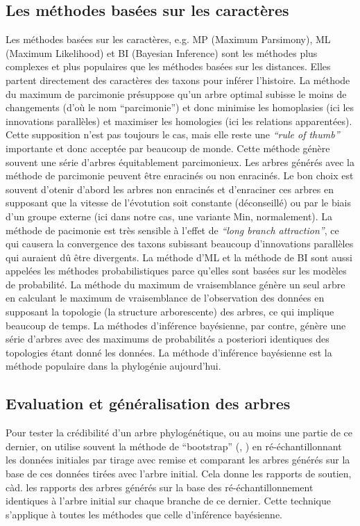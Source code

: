\documentclass{scrbook}
\newcounter{c}[subsubsection]
\begin{document}
\begin{sloppypar}
\subsection{Les méthodes basées sur les caractères}
Les méthodes basées sur les caractères, e.g. MP (Maximum Parsimony), ML (Maximum Likelihood) et BI (Bayesian Inference) sont les méthodes plus complexes et plus populaires que les méthodes basées sur les distances. Elles partent directement des caractères des taxons pour inférer l'histoire. La méthode du maximum de parcimonie présuppose qu'un arbre optimal subisse le moins de changements (d'où le nom ``parcimonie'') et donc minimise les homoplasies (ici les innovations parallèles) et maximiser les homologies (ici les relations apparentées). Cette supposition n'est pas toujours le cas, mais elle reste une \textit{``rule of thumb''} importante et donc acceptée par beaucoup de monde. Cette méthode génère souvent une série d'arbres équitablement parcimonieux. Les arbres générés avec la méthode de parcimonie peuvent être enracinés ou non enracinés. Le bon choix est souvent d'otenir d'abord les arbres non enracinés et d'enraciner ces arbres en supposant que la vitesse de l'évotution soit constante (déconseillé) ou par le biais d'un groupe externe (ici dans notre cas, une variante Min, normalement). La méthode de pacimonie est très sensible à l'effet de \textit{``long branch attraction''}, ce qui causera la convergence des taxons subissant beaucoup d'innovations parallèles qui auraient dû être divergents. La méthode d'ML et la méthode de BI sont aussi appelées les méthodes probabilistiques parce qu'elles sont basées sur les modèles de probabilité. La méthode du maximum de vraisemblance génère un seul arbre en calculant le maximum de vraisemblance de l'observation des données en supposant la topologie (la structure arborescente) des arbres, ce qui implique beaucoup de temps. La méthodes d'inférence bayésienne, par contre, génère une série d'arbres avec des maximums de probabilités a posteriori identiques des topologies étant donné les données. La méthode d'inférence bayésienne est la méthode populaire dans la phylogénie aujourd'hui. 

\subsection{Evaluation et généralisation des arbres}
Pour tester la crédibilité d'un arbre phylogénétique, ou au moins une partie de ce dernier, on utilise souvent la méthode de ``bootstrap'' (\cite[29]{judd2008plant}, \cite[92--93]{hall2018phylogenetic}) en ré-échantillonnant les données initiales par tirage avec remise et comparant les arbres générés sur la base de ces données tirées avec l'arbre initial. Cela donne les rapports de soutien, càd. les rapports des arbres générés sur la base des ré-échantillonnement identiques à l'arbre initial sur chaque branche de ce dernier. Cette technique s'applique à toutes les méthodes que celle d'inférence bayésienne.


\end{sloppypar}
\end{document}
